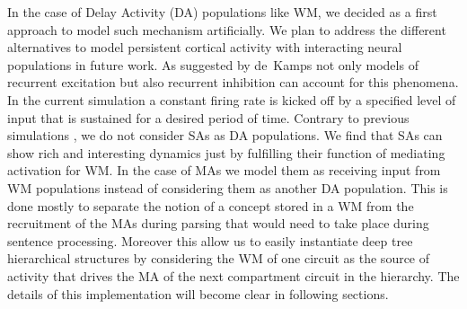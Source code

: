 \documentclass[10pt]{article}
\begin{document}
In the case of Delay Activity (DA) populations like WM, we decided as
a first approach to model such mechanism artificially. We plan to
address the different alternatives to model persistent cortical
activity with interacting neural populations in future work. As
suggested by de~Kamps\cite{de_Kamps_2005} not only models of recurrent
excitation but also recurrent inhibition can account for this
phenomena. In the current simulation a constant firing rate is kicked
off by a specified level of input that is sustained for a desired
period of time. Contrary to previous simulations
\cite{velde2015ambiguity}, we do not consider SAs as DA populations.
We find that SAs can show rich and interesting dynamics just by
fulfilling their function of mediating activation for WM. In the case
of MAs we model them as receiving input from WM populations instead of
considering them as another DA population. This is done mostly to
separate the notion of a concept stored in a WM from the recruitment
of the MAs during parsing that would need to take place during
sentence processing. Moreover this allow us to easily instantiate deep
tree hierarchical structures by considering the WM of one circuit as
the source of activity that drives the MA of the next compartment
circuit in the hierarchy. The details of this implementation will
become clear in following sections.
\end{document}

